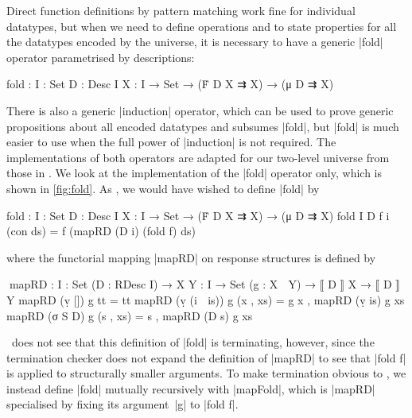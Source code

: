 Direct function definitions by pattern matching work fine for individual datatypes, but when we need to define operations and to state properties for all the datatypes encoded by the universe, it is necessary to have a generic |fold| operator parametrised by descriptions:
\begin{code}
fold : {I : Set} {D : Desc I} {X : I → Set} → (Ḟ D X ⇉ X) → (μ D ⇉ X)
\end{code}
There is also a generic |induction| operator, which can be used to prove generic propositions about all encoded datatypes and subsumes |fold|, but |fold| is much easier to use when the full power of |induction| is not required.
The implementations of both operators are adapted for our two-level universe from those in .
We look at the implementation of the |fold| operator only, which is shown in \autoref{fig:fold}.
As \citeauthor{McBride-ornaments}, we would have wished to define |fold| by
\begin{code}
fold : {I : Set} {D : Desc I} {X : I → Set} → (Ḟ D X ⇉ X) → (μ D ⇉ X)
fold {I} {D} f {i} (con ds) = f (mapRD (D i) (fold f) ds)
\end{code}
where the functorial mapping |mapRD| on response structures is defined by
\begin{code}
^^^mapRD :  {I : Set} (D : RDesc I) →
            {X Y : I → Set} (g : X ⇉ Y) → ⟦ D ⟧ X → ⟦ D ⟧ Y
mapRD (ṿ [])        g tt        = tt
mapRD (ṿ (i ∷ is))  g (x , xs)  = g x , mapRD (ṿ is) g xs
mapRD (σ S D)       g (s , xs)  = s , mapRD (D s) g xs
\end{code}
\Agda\ does not see that this definition of |fold| is terminating, however, since the termination checker does not expand the definition of |mapRD| to see that |fold f| is applied to structurally smaller arguments.
To make termination obvious to \Agda, we instead define |fold| mutually recursively with |mapFold|, which is |mapRD| specialised by fixing its argument~|g| to |fold f|.


